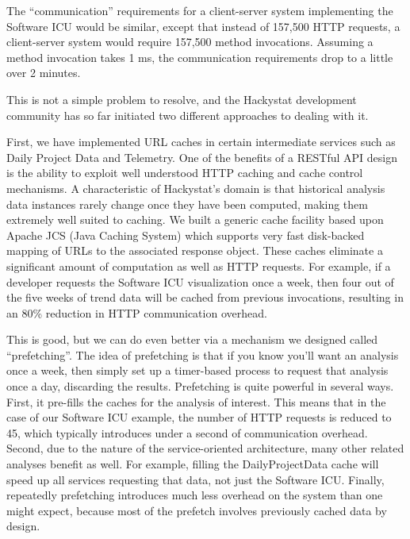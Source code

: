 \documentclass[conference,compsoc]{IEEEtran}
\begin{document}
The ``communication'' requirements for a client-server system implementing
the Software ICU would be similar, except that instead of 157,500 HTTP
requests, a client-server system would require 157,500 method invocations.
Assuming a method invocation takes 1 ms, the communication requirements
drop to a little over 2 minutes.

This is not a simple problem to resolve, and the Hackystat development
community has so far initiated two different approaches to dealing with
it.

First, we have implemented URL caches in certain intermediate services such
as Daily Project Data and Telemetry.  One of the benefits of a RESTful API
design is the ability to exploit well understood HTTP caching and cache
control mechanisms.  A characteristic of Hackystat's domain is that
historical analysis data instances rarely change once they have been
computed, making them extremely well suited to caching.  We built a generic
cache facility based upon Apache JCS (Java Caching System) which supports
very fast disk-backed mapping of URLs to the associated response
object. These caches eliminate a significant amount of computation as well
as HTTP requests.  For example, if a developer requests the Software ICU
visualization once a week, then four out of the five weeks of trend data
will be cached from previous invocations, resulting in an 80\% reduction in
HTTP communication overhead.

This is good, but we can do even better via a mechanism we designed called
``prefetching''.  The idea of prefetching is that if you know you'll want
an analysis once a week, then simply set up a timer-based process to
request that analysis once a day, discarding the results.  Prefetching is
quite powerful in several ways.  First, it pre-fills the caches for the
analysis of interest. This means that in the case of our Software ICU
example, the number of HTTP requests is reduced to 45, which typically introduces under a
second of communication overhead.  Second, due to the nature of the
service-oriented architecture, many other related analyses benefit as
well. For example, filling the DailyProjectData cache will speed up all
services requesting that data, not just the Software ICU.  Finally,
repeatedly prefetching introduces much less overhead on the system than one
might expect, because most of the prefetch involves previously cached data
by design.

\end{document}
